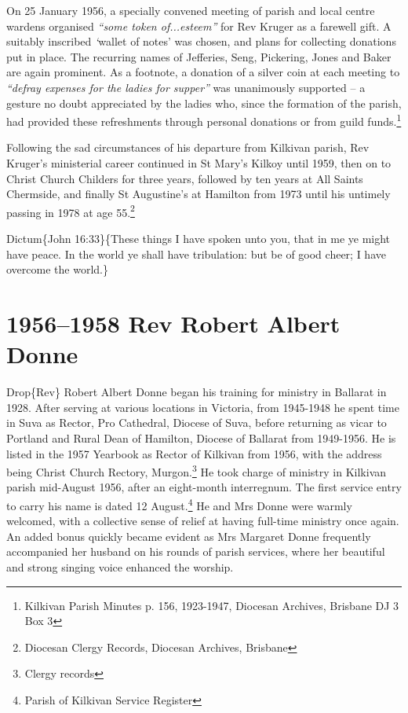 On 25 January 1956, a specially convened meeting of parish and local centre wardens organised \emph{``some token of...esteem''} for Rev Kruger as a farewell gift. A suitably inscribed \emph{`}wallet of notes' was chosen, and plans for collecting donations put in place. The recurring names of Jefferies, Seng, Pickering, Jones and Baker are again prominent. As a footnote, a donation of a silver coin at each meeting to \emph{``defray expenses for the ladies for supper''} was unanimously supported -- a gesture no doubt appreciated by the ladies who, since the formation of the parish, had provided these refreshments through personal donations or from guild funds.\footnote{Kilkivan Parish Minutes p. 156, 1923-1947, Diocesan Archives, Brisbane DJ 3 Box 3}

Following the sad circumstances of his departure from Kilkivan parish, Rev Kruger's ministerial career continued in St Mary's Kilkoy until 1959, then on to Christ Church Childers for three years, followed by ten years at All Saints Chermside, and finally St Augustine's at Hamilton from 1973 until his untimely passing in 1978 at age 55.\footnote{Diocesan Clergy Records, Diocesan Archives, Brisbane}

Dictum\{John 16:33\}\{These things I have spoken unto you, that in me ye might have peace. In the world ye shall have tribulation: but be of good cheer; I have overcome the world.\}

\hypertarget{rev-robert-albert-donne}{%
\chapter{1956--1958 Rev Robert Albert Donne}\label{rev-robert-albert-donne}}

Drop\{Rev\} Robert Albert Donne began his training for ministry in Ballarat in 1928. After serving at various locations in Victoria, from 1945-1948 he spent time in Suva as Rector, Pro Cathedral, Diocese of Suva, before returning as vicar to Portland and Rural Dean of Hamilton, Diocese of Ballarat from 1949-1956. He is listed in the 1957 Yearbook as Rector of Kilkivan from 1956, with the address being Christ Church Rectory, Murgon.\footnote{Clergy records} He took charge of ministry in Kilkivan parish mid-August 1956, after an eight-month interregnum. The first service entry to carry his name is dated 12 August.\footnote{Parish of Kilkivan Service Register} He and Mrs Donne were warmly welcomed, with a collective sense of relief at having full-time ministry once again. An added bonus quickly became evident as Mrs Margaret Donne frequently accompanied her husband on his rounds of parish services, where her beautiful and strong singing voice enhanced the worship.

